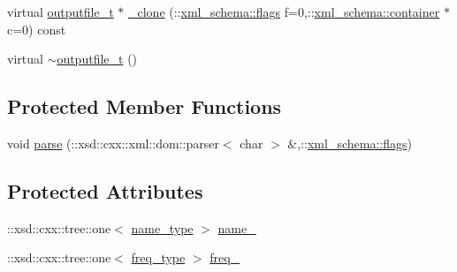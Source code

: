 \begin{DoxyCompactItemize}
\item 
virtual \hyperlink{classoutputfile__t}{outputfile\-\_\-t} $\ast$ \hyperlink{classoutputfile__t_a8c602afb39c4ce44f0b7604f83e4ccb3}{\-\_\-clone} (\-::\hyperlink{namespacexml__schema_a0612287d030cb2732d31a45b258fdc87}{xml\-\_\-schema\-::flags} f=0,\-::\hyperlink{namespacexml__schema_ada9aa30dc722e93ee2ed7243085402a5}{xml\-\_\-schema\-::container} $\ast$c=0) const 
\item 
virtual \hyperlink{classoutputfile__t_a746eb3e22698d25bb5c13cb4b138fc08}{$\sim$outputfile\-\_\-t} ()
\end{DoxyCompactItemize}
\subsection*{Protected Member Functions}
\begin{DoxyCompactItemize}
\item 
void \hyperlink{classoutputfile__t_a1d428888cb0aa643c8c02865c883a595}{parse} (\-::xsd\-::cxx\-::xml\-::dom\-::parser$<$ char $>$ \&,\-::\hyperlink{namespacexml__schema_a0612287d030cb2732d31a45b258fdc87}{xml\-\_\-schema\-::flags})
\end{DoxyCompactItemize}
\subsection*{Protected Attributes}
\begin{DoxyCompactItemize}
\item 
\-::xsd\-::cxx\-::tree\-::one$<$ \hyperlink{classoutputfile__t_a9207f2bca21ee3d91246fae00c13d24b}{name\-\_\-type} $>$ \hyperlink{classoutputfile__t_a593a1f4fb1a7e2c1f9cace3a5fc9bc11}{name\-\_\-}
\item 
\-::xsd\-::cxx\-::tree\-::one$<$ \hyperlink{classoutputfile__t_a6a45c7bbd6bb78b02c32b155fdc19dda}{freq\-\_\-type} $>$ \hyperlink{classoutputfile__t_a7d4cbfeeb02491ef8dfe4df991e3e85f}{freq\-\_\-}
\end{DoxyCompactItemize}


